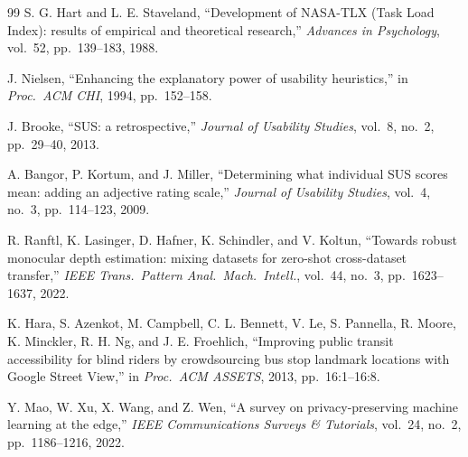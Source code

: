 \documentclass[11pt,a4paper]{article}
\begin{document}
\begin{thebibliography}{99}
S. G. Hart and L. E. Staveland, ``Development of NASA-TLX (Task Load
Index): results of empirical and theoretical research,''
\emph{Advances in Psychology}, vol.\ 52, pp.\ 139--183, 1988.

J. Nielsen, ``Enhancing the explanatory power of usability heuristics,''
in \emph{Proc.\ ACM CHI}, 1994, pp.\ 152--158.

J. Brooke, ``SUS: a retrospective,'' \emph{Journal of Usability
Studies}, vol.\ 8, no.\ 2, pp.\ 29--40, 2013.

A. Bangor, P. Kortum, and J. Miller, ``Determining what individual SUS
scores mean: adding an adjective rating scale,'' \emph{Journal of
Usability Studies}, vol.\ 4, no.\ 3, pp.\ 114--123, 2009.

R. Ranftl, K. Lasinger, D. Hafner, K. Schindler, and V. Koltun,
``Towards robust monocular depth estimation: mixing datasets for
zero-shot cross-dataset transfer,'' \emph{IEEE Trans.\ Pattern Anal.\
Mach.\ Intell.}, vol.\ 44, no.\ 3, pp.\ 1623--1637, 2022.

K. Hara, S. Azenkot, M. Campbell, C. L. Bennett, V. Le, S. Pannella,
R. Moore, K. Minckler, R. H. Ng, and J. E. Froehlich, ``Improving
public transit accessibility for blind riders by crowdsourcing bus stop
landmark locations with Google Street View,'' in \emph{Proc.\ ACM
ASSETS}, 2013, pp.\ 16:1--16:8.

Y. Mao, W. Xu, X. Wang, and Z. Wen, ``A survey on privacy-preserving
machine learning at the edge,'' \emph{IEEE Communications Surveys \&
Tutorials}, vol.\ 24, no.\ 2, pp.\ 1186--1216, 2022.

\end{thebibliography}
\end{document}
